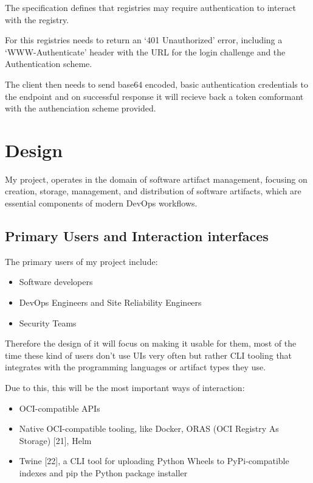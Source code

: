 \documentclass{article}
\begin{document}
  The specification defines that registries may require authentication to interact with the registry.

  For this registries needs to return an `401 Unauthorized' error, including a `WWW-Authenticate' header with the URL for the login challenge and the Authentication scheme.
  
  The client then needs to send base64 encoded, basic authentication credentials to the endpoint and on successful response it will recieve back a token comformant with the authenciation scheme provided. 

  \section{Design}

  My project, operates in the domain of software artifact management, focusing on creation, storage, management, and distribution of software artifacts, which are essential components of modern DevOps workflows.

  \subsection{Primary Users and Interaction interfaces}

  The primary users of my project include:

  \begin{itemize}
    \item Software developers
    \item DevOps Engineers and Site Reliability Engineers
    \item Security Teams
  \end{itemize}
  
  Therefore the design of it will focus on making it usable for them, most of the time these kind of users don't use UIs very often but rather CLI tooling that integrates with the programming languages or artifact types they use.

  Due to this, this will be the most important ways of interaction:

  \begin{itemize}
    \item OCI-compatible APIs
    \item Native OCI-compatible tooling, like Docker, ORAS (OCI Registry As Storage) [21], Helm
    \item Twine [22], a CLI tool for uploading Python Wheels to PyPi-compatible indexes and pip the Python package installer
  \end{itemize}
\end{document}
